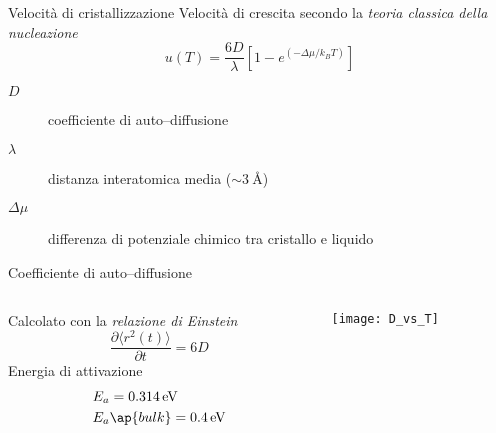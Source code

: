 \documentclass{beamer}
\begin{document}
\begin{frame}{Velocità di cristallizzazione}
 Velocità di crescita secondo la \emph{teoria classica della nucleazione}
  \begin{equation*}
    u(T)= \frac{6D}{\lambda} \left[ 1- e^{ \left( -\Delta\mu/k_B T\right) } \right]
  \end{equation*}
  \begin{center}
  \begin{description}
   \item [$D$] coefficiente di auto--diffusione
   \item [$\lambda$] distanza interatomica media ($\sim \SI{3}{\angstrom}$)
   \item [$\Delta\mu$] differenza di potenziale chimico tra cristallo e liquido
  \end{description}  
  \end{center}
\end{frame}


\begin{frame}{Coefficiente di auto--diffusione}
 \begin{columns}
  \begin{column}{0.5\textwidth}
   Calcolato con la \emph{relazione di Einstein}
   \begin{equation*}
    \frac{\partial\langle r^2(t)\rangle}{\partial t}=6D
   \end{equation*}
   Energia di attivazione
   \begin{equation*}
    \begin{split}
        &E_a = \SI{0.314}{eV}\\
	&E_a\ap{bulk} = \SI{0.4}{eV}
    \end{split}
   \end{equation*}
  \end{column}
  \begin{column}{0.5\textwidth}
  \centering
   \texttt{[image: D\_vs\_T]}
   \begin{table}[h]
   \begin{center}
    \end{center}
  \end{table}
  \end{column}


 \end{columns}

\end{frame}
\end{document}
